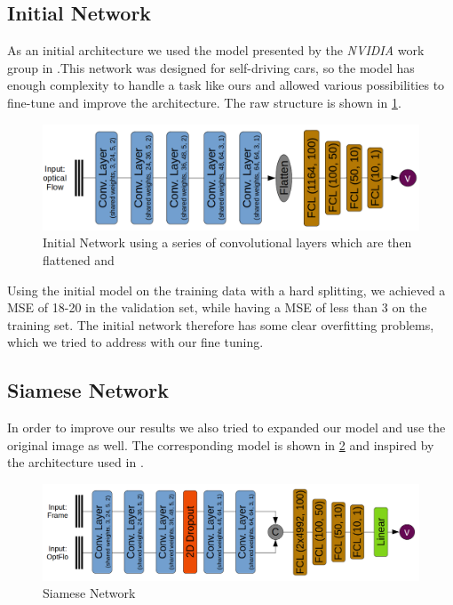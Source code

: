 \documentclass[conference]{IEEEtran}
\begin{document}
\subsection{Initial Network}

As an initial architecture we used the model presented by the \emph{NVIDIA} work group in 
\cite{NVIDIA2016}.This network was designed for self-driving cars, so the model has enough complexity to 
handle a task like ours and allowed various possibilities to fine-tune and improve the architecture. The 
raw structure is shown in \cref{fig:initialNetwork}.

\begin{figure}[ht]
	\centering
	\includegraphics[width=0.9\columnwidth]{imgs/InitialNetwork.png}
	\caption{Initial Network using a series of convolutional layers which are then flattened and }
	\label{fig:initialNetwork}
\end{figure}

Using the initial model on the training data with a hard splitting, we achieved a MSE of 18-20 in the validation set, while having a MSE of less than 3 on the training set. The initial network therefore has some clear overfitting problems, which we tried to address with our fine tuning.

\subsection{Siamese Network}

In order to improve our results we also tried to expanded our model and use the original image as well. The corresponding model is shown in \cref{fig:siameseNetwork} and inspired by the architecture used in
\cite{Wang2017}.

\begin{figure}[ht]
	\centering
	\includegraphics[width=0.9\columnwidth]{imgs/siamese_model.png}
	\caption{Siamese Network}
	\label{fig:siameseNetwork}
\end{figure}
\end{document}

